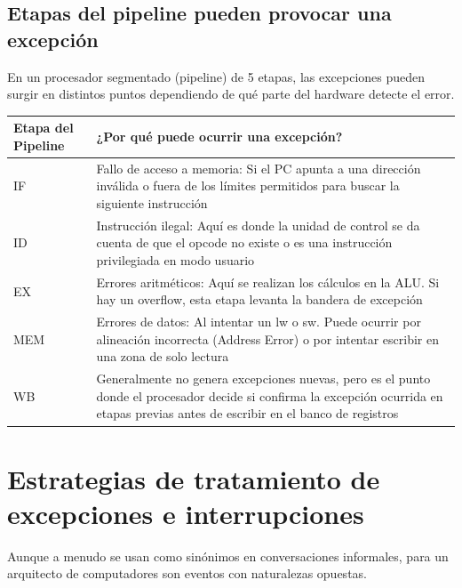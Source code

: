 \documentclass[]{article}
\begin{document}
	\subsection{Etapas del pipeline pueden provocar una excepción}
		En un procesador segmentado (pipeline) de 5 etapas, las excepciones pueden surgir en distintos puntos dependiendo de qué parte del hardware detecte el error.
		\\
		\begin{tabular}{|>{\centering\arraybackslash}m{2cm}|>{\centering\arraybackslash}m{9cm}|}
			\hline
			Etapa del Pipeline & ¿Por qué puede ocurrir una excepción? \\
			\hline
			IF & Fallo de acceso a memoria: Si el PC apunta a una dirección inválida o fuera de los límites permitidos para buscar la siguiente instrucción \\
			\hline
			ID & Instrucción ilegal: Aquí es donde la unidad de control se da cuenta de que el opcode no existe o es una instrucción privilegiada en modo usuario \\
			\hline
			EX & Errores aritméticos: Aquí se realizan los cálculos en la ALU. Si hay un overflow, esta etapa levanta la bandera de excepción \\
			\hline
			MEM & Errores de datos: Al intentar un lw o sw. Puede ocurrir por alineación incorrecta (Address Error) o por intentar escribir en una zona de solo lectura \\
			\hline
			WB & Generalmente no genera excepciones nuevas, pero es el punto donde el procesador decide si confirma la excepción ocurrida en etapas previas antes de escribir en el banco de registros \\
			\hline
		\end{tabular}
		
\section{Estrategias de tratamiento de excepciones e interrupciones}
	Aunque a menudo se usan como sinónimos en conversaciones informales, para un arquitecto de computadores son eventos con naturalezas opuestas.
\end{document}
